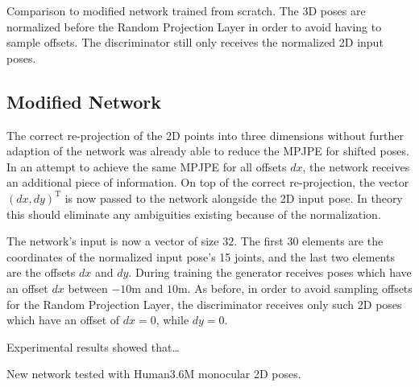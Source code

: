 Comparison to modified network trained from scratch.
The 3D poses are normalized before the Random Projection Layer in order to avoid having to sample offsets.
The discriminator still only receives the normalized 2D input poses.


\subsection{Modified Network}
The correct re-projection of the 2D points into three dimensions without further adaption of the network was already able to reduce the MPJPE for shifted poses.
In an attempt to achieve the same MPJPE for all offsets $dx$, the network receives an additional piece of information.
On top of the correct re-projection, the vector $(dx, dy)^\mathrm{T}$ is now passed to the network alongside the 2D input pose.
In theory this should eliminate any ambiguities existing because of the normalization.

The network's input is now a vector of size $32$. 
The first $30$ elements are the coordinates of the normalized input pose's 15 joints, and the last two elements are the offsets $dx$ and $dy$.
During training the generator receives poses which have an offset $dx$ between $-10$m and $10$m.
As before, in order to avoid sampling offsets for the Random Projection Layer, the discriminator receives only such 2D poses which have an offset of $dx = 0$, while $dy = 0$.

Experimental results showed that\dots

New network tested with Human3.6M monocular 2D poses.


